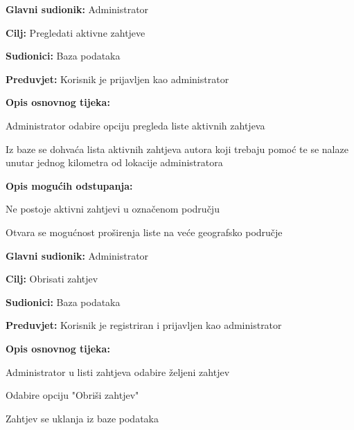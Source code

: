 \noindent {}
\begin{packed_item}
	\item \textbf{Glavni sudionik: }Administrator
	\item  \textbf{Cilj:} Pregledati aktivne zahtjeve
	\item  \textbf{Sudionici:} Baza podataka
	\item  \textbf{Preduvjet:} Korisnik je prijavljen kao administrator
	\item  \textbf{Opis osnovnog tijeka:}
	\item[] \begin{packed_enum}
		\item Administrator odabire opciju pregleda liste aktivnih zahtjeva
		\item Iz baze se dohvaća lista aktivnih zahtjeva autora koji trebaju pomoć te se nalaze unutar jednog kilometra od lokacije administratora
	\end{packed_enum}
	\item  \textbf{Opis mogućih odstupanja:}
	\item[] \begin{packed_item}
		\item[2.a] Ne postoje aktivni zahtjevi u označenom području
		\item[] \begin{packed_enum}
			\item Otvara se mogućnost proširenja liste na veće geografsko područje
		\end{packed_enum}
	\end{packed_item}
\end{packed_item}

\noindent {}
\begin{packed_item}
	\item \textbf{Glavni sudionik: }Administrator
	\item  \textbf{Cilj:} Obrisati zahtjev
	\item  \textbf{Sudionici:} Baza podataka
	\item  \textbf{Preduvjet:} Korisnik je registriran i prijavljen kao administrator
	\item  \textbf{Opis osnovnog tijeka:}
	\item[] \begin{packed_enum}
		\item Administrator u listi zahtjeva odabire željeni zahtjev
		\item Odabire opciju "Obriši zahtjev"
		\item Zahtjev se uklanja iz baze podataka
	\end{packed_enum}
\end{packed_item}

